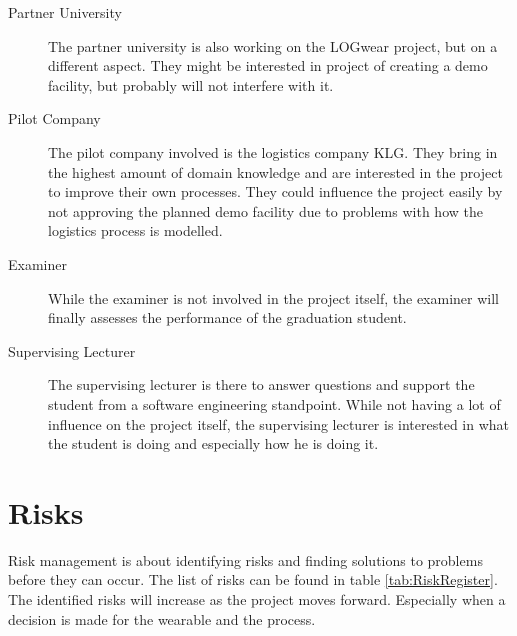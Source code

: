 \begin{description}
	\item[Partner University] \hfill
	
	The partner university is also working on the LOGwear project, but on a different aspect. They might be interested in project of creating a demo facility, but probably will not interfere with it.\\
	
	\item[Pilot Company] \hfill
	
	The pilot company involved is the logistics company KLG. They bring in the highest amount of domain knowledge and are interested in the project to improve their own processes. They could influence the project easily by not approving the planned demo facility due to problems with how the logistics process is modelled.
	\item[Examiner] \hfill
	
	While the examiner is not involved in the project itself, the examiner will finally assesses the performance of the graduation student.
	\item[Supervising Lecturer] \hfill
	
	The supervising lecturer is there to answer questions and support the student from a software engineering standpoint. While not having a lot of influence on the project itself, the supervising lecturer is interested in what the student is doing and especially how he is doing it.
\end{description}

\section{Risks}\label{sec:risks}
Risk management is about identifying risks and finding solutions to problems before they can occur. The list of risks can be found in table \ref{tab:RiskRegister}. The identified risks will increase as the project moves forward. Especially when a decision is made for the wearable and the process. 

